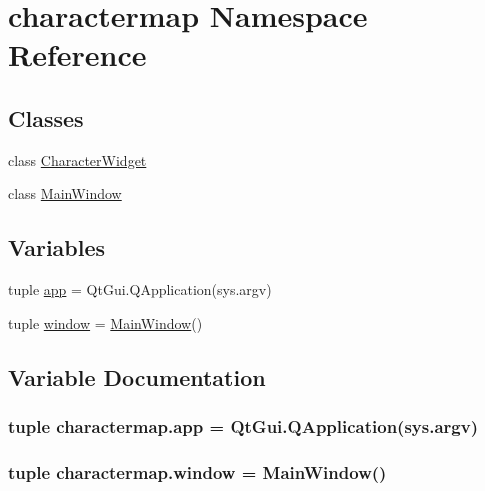 \hypertarget{namespacecharactermap}{}\section{charactermap Namespace Reference}
\label{namespacecharactermap}
\subsection*{Classes}
\begin{DoxyCompactItemize}
\item 
class \hyperlink{classcharactermap_1_1CharacterWidget}{Character\+Widget}
\item 
class \hyperlink{classcharactermap_1_1MainWindow}{Main\+Window}
\end{DoxyCompactItemize}
\subsection*{Variables}
\begin{DoxyCompactItemize}
\item 
tuple \hyperlink{namespacecharactermap_af531795c247e1978da5d249238b98412}{app} = Qt\+Gui.\+Q\+Application(sys.\+argv)
\item 
tuple \hyperlink{namespacecharactermap_aa4dc321b927ba44bdb57f6a95ac7cb0d}{window} = \hyperlink{classcharactermap_1_1MainWindow}{Main\+Window}()
\end{DoxyCompactItemize}


\subsection{Variable Documentation}
\hypertarget{namespacecharactermap_af531795c247e1978da5d249238b98412}{}
\subsubsection[{app}]{\setlength{\rightskip}{0pt plus 5cm}tuple charactermap.\+app = Qt\+Gui.\+Q\+Application(sys.\+argv)}\label{namespacecharactermap_af531795c247e1978da5d249238b98412}
\hypertarget{namespacecharactermap_aa4dc321b927ba44bdb57f6a95ac7cb0d}{}
\subsubsection[{window}]{\setlength{\rightskip}{0pt plus 5cm}tuple charactermap.\+window = {\bf Main\+Window}()}\label{namespacecharactermap_aa4dc321b927ba44bdb57f6a95ac7cb0d}
